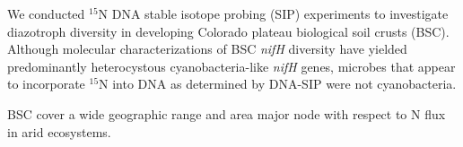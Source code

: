 We conducted $^{15}$N DNA stable isotope probing (SIP) experiments to investigate diazotroph diversity in developing Colorado plateau biological soil crusts (BSC). Although molecular characterizations of BSC \textit{nifH} diversity have yielded predominantly heterocystous cyanobacteria-like \textit{nifH} genes, microbes that appear to incorporate $^{15}$N into DNA as determined by DNA-SIP were not cyanobacteria.

BSC cover a wide geographic range and area major node with respect to N flux in arid ecosystems.


